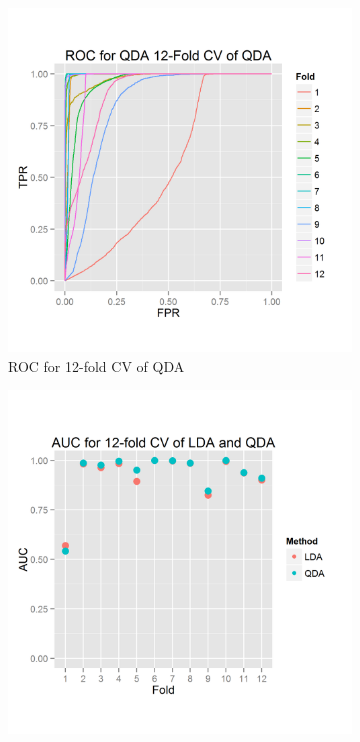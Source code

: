 \documentclass{article}\usepackage[]{graphicx}\usepackage[]{color}
\begin{document}
\begin{figure}[h]
  \centering 
  \begin{subfigure}[b]{0.3\textwidth}
    \includegraphics[width=\linewidth]{ROC_12_folds_DA.png}
    \caption{ROC for 12-fold CV of QDA}
    \label{12-foldROC}
  \end{subfigure}  
  \begin{subfigure}[b]{0.3\textwidth}
    \includegraphics[width=\linewidth]{AUC_12_folds_DA.png}

\end{subfigure}
\end{figure}
\end{document}
